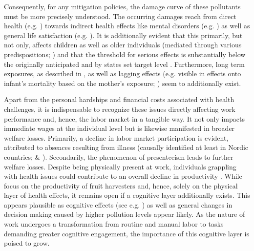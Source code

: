 \documentclass[12pt,a4paper]{article}
\begin{document}
Consequently, for any mitigation policies, the damage curve of these pollutants must be more precisely understood. The occurring damages reach from direct health (e.g. \citealp{schlenker2016,kampa2008,chen2021}) towards indirect health effects like mental disorders (e.g. \citealp{pedersen2004,szyszkowicz2007,zhang2017}) as well as general life satisfaction (e.g. \citealp{mackerron2009,rehdanz2008,szyszkowicz2007}). It is additionally evident that this primarily, but not only, affects children \citep{beatty2014} as well as older individuals (mediated through various predispositions; \citealp{peled2011}) and that the threshold for serious effects is substantially below the originally anticipated and by states set target level \citep{beelen2014}. Furthermore, long term exposures, as described in \citet{beelen2014}, as well as lagging effects (e.g. visible in effects onto infant's mortality based on the mother's exposure; \citealp{chay2003}) seem to additionally exist.

Apart from the personal hardships and financial costs associated with health challenges, it is indispensable to recognize these issues directly affecting work performance and, hence, the labor market in a tangible way. It not only impacts immediate wages at the individual level but is likewise manifested in broader welfare losses. Primarily, a decline in labor market participation is evident, attributed to absences resulting from illness (causally identified at least in Nordic countries; \citealp{hansen2000} \& \citealp{jans2018}). Secondarily, the phenomenon of presenteeism leads to further welfare losses. Despite being physically present at work, individuals grappling with health issues could contribute to an overall decline in productivity \citep{zivin2012}. While \citet{zivin2012} focus on the productivity of fruit harvesters and, hence, solely on the physical layer of health effects, it remains open if a cognitive layer additionally exists. This appears plausible as cognitive effects (see e.g. \citealp{schikowski2015,tonne2014,ranft2009}) as well as general changes in decision making \citep{archsmith2018} caused by higher pollution levels appear likely. As the nature of work undergoes a transformation from routine and manual labor to tasks demanding greater cognitive engagement, the importance of this cognitive layer
is poised to grow.
\end{document}
